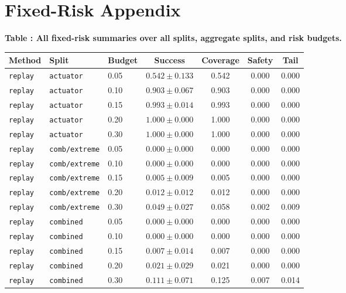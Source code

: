 \documentclass{article}
\begin{document}
\section{Fixed-Risk Appendix}
\tiny
\setlength{\tabcolsep}{2pt}
\begin{center}
\label{tab:fixedall}\textbf{Table \thetable: All fixed-risk summaries over all splits, aggregate splits, and risk budgets.}\\[0.4ex]
\begin{tabular}{lllcccc}
\toprule
Method & Split & Budget & Success & Coverage & Safety & Tail \\
\midrule
\texttt{replay} & \texttt{actuator} & 0.05 & $0.542 \pm 0.133$ & 0.542 & 0.000 & 0.000 \\
\texttt{replay} & \texttt{actuator} & 0.10 & $0.903 \pm 0.067$ & 0.903 & 0.000 & 0.000 \\
\texttt{replay} & \texttt{actuator} & 0.15 & $0.993 \pm 0.014$ & 0.993 & 0.000 & 0.000 \\
\texttt{replay} & \texttt{actuator} & 0.20 & $1.000 \pm 0.000$ & 1.000 & 0.000 & 0.000 \\
\texttt{replay} & \texttt{actuator} & 0.30 & $1.000 \pm 0.000$ & 1.000 & 0.000 & 0.000 \\
\texttt{replay} & \texttt{comb/extreme} & 0.05 & $0.000 \pm 0.000$ & 0.000 & 0.000 & 0.000 \\
\texttt{replay} & \texttt{comb/extreme} & 0.10 & $0.000 \pm 0.000$ & 0.000 & 0.000 & 0.000 \\
\texttt{replay} & \texttt{comb/extreme} & 0.15 & $0.005 \pm 0.009$ & 0.005 & 0.000 & 0.000 \\
\texttt{replay} & \texttt{comb/extreme} & 0.20 & $0.012 \pm 0.012$ & 0.012 & 0.000 & 0.000 \\
\texttt{replay} & \texttt{comb/extreme} & 0.30 & $0.049 \pm 0.027$ & 0.058 & 0.002 & 0.009 \\
\texttt{replay} & \texttt{combined} & 0.05 & $0.000 \pm 0.000$ & 0.000 & 0.000 & 0.000 \\
\texttt{replay} & \texttt{combined} & 0.10 & $0.000 \pm 0.000$ & 0.000 & 0.000 & 0.000 \\
\texttt{replay} & \texttt{combined} & 0.15 & $0.007 \pm 0.014$ & 0.007 & 0.000 & 0.000 \\
\texttt{replay} & \texttt{combined} & 0.20 & $0.021 \pm 0.029$ & 0.021 & 0.000 & 0.000 \\
\texttt{replay} & \texttt{combined} & 0.30 & $0.111 \pm 0.071$ & 0.125 & 0.007 & 0.014 \\

\end{tabular}
\end{center}
\end{document}
